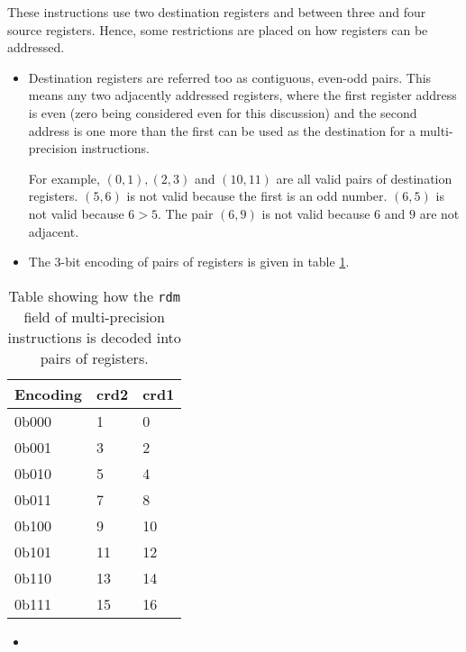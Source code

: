 These instructions use two destination registers and between three
and four source registers. Hence, some restrictions are placed on how
registers can be addressed.

\begin{itemize}
\item
Destination registers are referred too as contiguous, even-odd pairs.
This means any two adjacently addressed registers, where the
first register address is even (zero being considered even for this
discussion) and the second address is one more than the first can be
used as the destination for a multi-precision instructions.

For example, $(0,1), (2,3)$ and $(10,11)$ are all valid
pairs of destination registers.
$(5,6)$ is not valid because the first
is an odd number. $(6,5)$ is not valid because $6 > 5$.
The pair $(6,9)$
is not valid because $6$ and $9$ are not adjacent.

\item
The 3-bit encoding of pairs of registers is given in table 
\ref{tab:rdm-encodings}.
\end{itemize}

\begin{table}
\centering
\begin{tabular}{lll}
\hline
Encoding & crd2 & crd1 \\ \hline
0b000      & 1    & 0    \\
0b001      & 3    & 2    \\
0b010      & 5    & 4    \\
0b011      & 7    & 8    \\
0b100      & 9    & 10   \\
0b101      & 11   & 12   \\
0b110      & 13   & 14   \\
0b111      & 15   & 16   \\ \hline
\end{tabular}
\caption{
    Table showing how the {\tt rdm} field of multi-precision instructions
    is decoded into pairs of registers.
}
\label{tab:rdm-encodings}
\end{table}

{\iencaddtwomp}
{
}{
\begin{itemize}
\item {}
\end{itemize}
}{}


